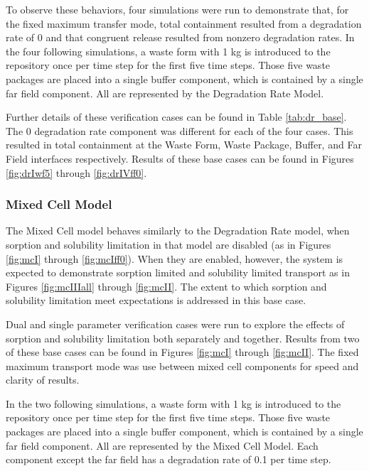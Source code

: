 To observe these behaviors, four simulations were run to demonstrate that, for 
the fixed maximum transfer mode, total 
containment resulted from a degradation rate of 0 and that congruent release 
resulted from nonzero degradation rates. 
In the four following simulations, a waste form with 1 kg is introduced to the repository once 
per time step for the first five time steps. Those five waste packages are 
placed into a single buffer component, which is contained by a single far field 
component. All are represented by the Degradation Rate Model. 

Further details of these verification 
cases can be found in Table \ref{tab:dr_base}. The 0 degradation rate component was 
different for each of the four cases. This resulted in total containment at the 
Waste Form, Waste Package, Buffer, and Far Field interfaces respectively.  Results of these base cases can be found in Figures \ref{fig:drIwf5} through \ref{fig:drIVff0}.

\FloatBarrier


\FloatBarrier

\subsubsection{Mixed Cell Model}
The Mixed Cell model behaves similarly to the Degradation Rate model, when 
sorption and solubility limitation in that model are disabled (as in Figures 
\ref{fig:mcI} through \ref{fig:mcIff0}). When they are enabled, however, the 
system is expected to demonstrate sorption limited and solubility limited 
transport as in Figures \ref{fig:mcIIIall} through \ref{fig:mcII}. The extent 
to which sorption and solubility limitation meet expectations is addressed in 
this base case.  

Dual and single parameter verification cases were run to explore the effects of 
sorption and solubility limitation both separately and together.  Results from 
two of these base cases can be found in Figures \ref{fig:mcI} through 
\ref{fig:mcII}.
The fixed maximum transport mode was use between mixed cell components for speed 
and clarity of results.

In the two following simulations, a waste form with 1 kg is introduced to the repository once 
per time step for the first five time steps. Those five waste packages are 
placed into a single buffer component, which is contained by a single far field 
component. All are represented by the Mixed Cell Model. Each component except 
the far field has a degradation rate of 0.1 per time step.

